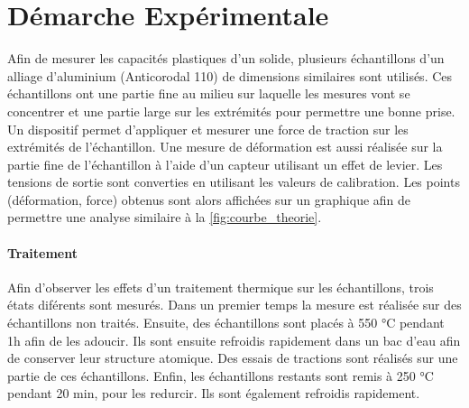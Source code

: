 \section{Démarche Expérimentale}

Afin de mesurer les capacités plastiques d'un solide, plusieurs échantillons d'un alliage d'aluminium (Anticorodal 110) de dimensions similaires sont utilisés. Ces échantillons ont une partie fine au milieu sur laquelle les mesures vont se concentrer et une partie large sur les extrémités pour permettre une bonne prise. Un dispositif permet d'appliquer et mesurer une force de traction sur les extrémités de l'échantillon. Une mesure de déformation est aussi réalisée sur la partie fine de l'échantillon à l'aide d'un capteur utilisant un effet de levier. Les tensions de sortie sont converties en utilisant les valeurs de calibration. Les points (déformation, force) obtenus sont alors affichées sur un graphique afin de permettre une analyse similaire à la \autoref{fig:courbe_theorie}.

\paragraph{Traitement} Afin d'observer les effets d'un traitement thermique sur les échantillons, trois états diférents sont mesurés. Dans un premier temps la mesure est réalisée sur des échantillons non traités. Ensuite, des échantillons sont placés à 550 \si{\celsius} pendant 1h afin de les adoucir. Ils sont ensuite refroidis rapidement dans un bac d'eau afin de conserver leur structure atomique. Des essais de tractions sont réalisés sur une partie de ces échantillons. Enfin, les échantillons restants sont remis à 250 \si{\celsius} pendant 20 min, pour les redurcir. Ils sont également refroidis rapidement.